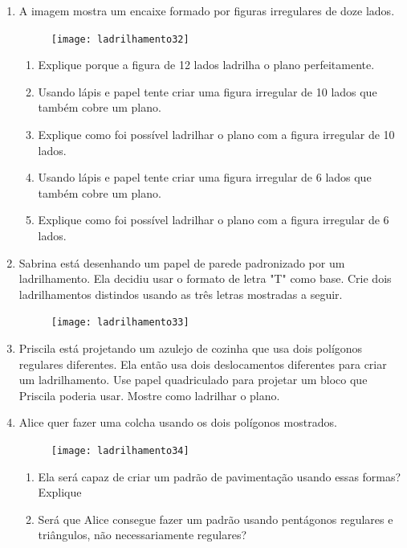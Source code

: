 \begin{enumerate}
	\item A imagem mostra um encaixe formado por figuras irregulares de doze lados. 

	\begin{figure}[H]
	\centering
	\texttt{[image: ladrilhamento32]}

	\end{figure}
	\begin{enumerate}
		\item Explique porque a figura de 12 lados ladrilha o plano perfeitamente.
		\item Usando lápis e papel tente criar uma figura irregular de 10 lados que também cobre um plano.
		\item Explique como foi possível ladrilhar o plano com a figura irregular de 10 lados.
		\item Usando lápis e papel tente criar uma figura irregular de 6 lados que também cobre um plano.
		\item Explique como foi possível ladrilhar o plano com a figura irregular de 6 lados.
	\end{enumerate}

	\item Sabrina está desenhando um papel de parede padronizado por um ladrilhamento. Ela decidiu usar o formato de letra "T" como base. Crie dois ladrilhamentos distindos usando as três letras mostradas a seguir.

	\begin{figure}[H]
	\centering
	\texttt{[image: ladrilhamento33]}

	\end{figure}

	\item Priscila está projetando um azulejo de cozinha que usa dois polígonos regulares diferentes. Ela então usa dois deslocamentos diferentes para criar um ladrilhamento. Use papel quadriculado para projetar um bloco que Priscila poderia usar. Mostre como ladrilhar o plano.

	\item Alice quer fazer uma colcha usando os dois polígonos mostrados.

	\begin{figure}[H]
	\centering
	\texttt{[image: ladrilhamento34]}

	\end{figure}

	\begin{enumerate}
		\item Ela será capaz de criar um padrão de pavimentação usando essas formas? Explique
		\item Será que Alice consegue fazer um padrão usando pentágonos regulares e triângulos, não necessariamente regulares?
	\end{enumerate}
\end{enumerate}




